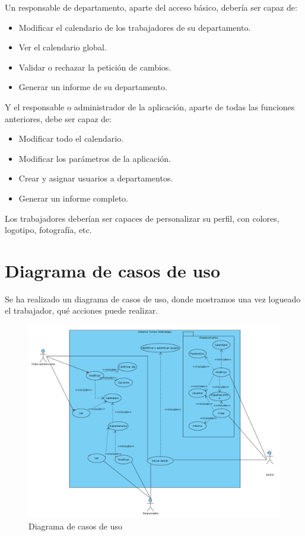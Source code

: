 \documentclass[11pt,spanish,listoffigures,listoftables]{tfgetsinf}
\begin{document}
Un responsable de departamento, aparte del acceso básico, debería ser capaz de:

\begin{itemize}
   \item Modificar el calendario de los trabajadores de su departamento.
   \item Ver el calendario global.
   \item Validar o rechazar la petición de cambios.
   \item Generar un informe de su departamento.
\end{itemize}

Y el responsable o administrador de la aplicación, aparte de todas las funciones anteriores, debe ser capaz de:

\begin{itemize}
   \item Modificar todo el calendario.
   \item Modificar los parámetros de la aplicación.
   \item Crear y asignar usuarios a departamentos.
   \item Generar un informe completo.
\end{itemize}

Los trabajadores deberían ser capaces de personalizar su perfil, con colores, logotipo, fotografía, etc.

\section{Diagrama de casos de uso}

Se ha realizado un diagrama de casos de uso, donde mostramos una vez logueado el trabajador, qué acciones puede realizar.

\begin{figure}[h!] %
   \includegraphics[width=\linewidth]{img/Casos de uso.png}
   \caption{Diagrama de casos de uso}
   \label{fig:CasosUso1}
 \end{figure}
\end{document}
